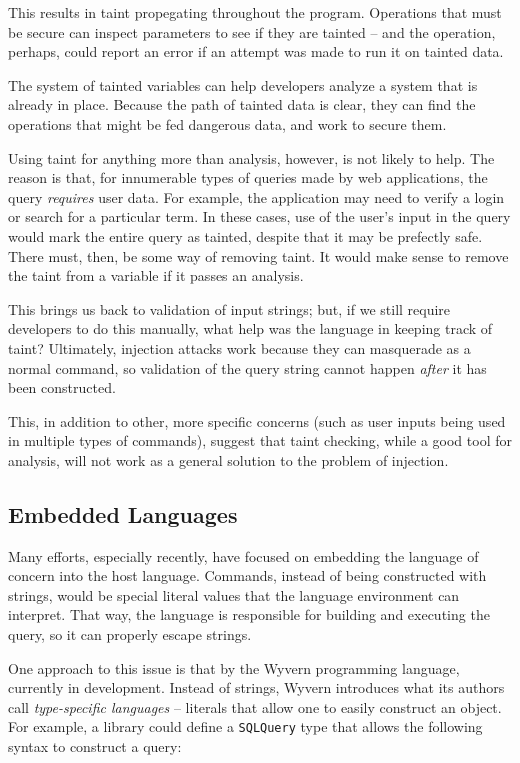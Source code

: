 \documentclass[twocolumn]{article}
\begin{document}
This results in taint propegating throughout the program.  Operations that must be secure can inspect parameters to see if they are tainted -- and the operation, perhaps, could report an error if an attempt was made to run it on tainted data.

The system of tainted variables can help developers analyze a system that is already in place.  Because the path of tainted data is clear, they can find the operations that might be fed dangerous data, and work to secure them.

Using taint for anything more than analysis, however, is not likely to help.  The reason is that, for innumerable types of queries made by web applications, the query \textit{requires} user data.  For example, the application may need to verify a login or search for a particular term.  In these cases, use of the user's input in the query would mark the entire query as tainted, despite that it may be prefectly safe.  There must, then, be some way of removing taint.  It would make sense to remove the taint from a variable if it passes an analysis.

This brings us back to validation of input strings; but, if we still require developers to do this manually, what help was the language in keeping track of taint?  Ultimately, injection attacks work because they can masquerade as a normal command, so validation of the query string cannot happen \textit{after} it has been constructed.

This, in addition to other, more specific concerns (such as user inputs being used in multiple types of commands), suggest that taint checking, while a good tool for analysis, will not work as a general solution to the problem of injection.

\subsection{Embedded Languages}
Many efforts, especially recently, have focused on embedding the language of concern into the host language.  Commands, instead of being constructed with strings, would be special literal values that the language environment can interpret.  That way, the language is responsible for building and executing the query, so it can properly escape strings.

One approach to this issue is that by the Wyvern programming language, currently in development.\cite{wyvern-short}  Instead of strings, Wyvern introduces what its authors call \textit{type-specific languages} -- literals that allow one to easily construct an object.\cite{wyvern-long}  For example, a library could define a \verb;SQLQuery; type that allows the following syntax to construct a query:
\end{document}
